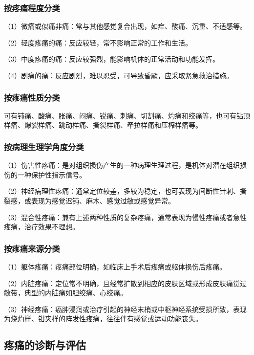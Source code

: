\subsubsection{按疼痛程度分类}

（1）微痛或似痛非痛：常与其他感觉复合出现，如痒、酸痛、沉重、不适感等。

（2）轻度疼痛的痛：反应较轻，常不影响正常的工作和生活。

（3）中度疼痛的痛：反应较强烈，能影响机体的正常活动和功能发挥。

（4）剧痛的痛：反应剧烈，难以忍受，可导致昏厥，应采取紧急救治措施。

\subsubsection{按疼痛性质分类}

可有钝痛、酸痛、胀痛、闷痛、锐痛、刺痛、切割痛、灼痛和绞痛等，也可有钻顶样痛、爆裂样痛、跳动样痛、撕裂样痛、牵拉样痛和压榨样痛等。

\subsubsection{按病理生理学角度分类}

（1）伤害性疼痛：是对组织损伤产生的一种病理生理过程，是机体对潜在组织损伤的一种保护性指示信号。

（2）神经病理性疼痛：通常定位较差，多较为稳定，也可表现为间断性针刺、撕裂感，或表现为感觉迟钝、麻木、感觉过敏或感觉异常。

（3）混合性疼痛：兼有上述两种性质的复杂疼痛，通常表现为慢性疼痛或者急性疼痛，治疗效果不理想。

\subsubsection{按疼痛来源分类}

（1）躯体疼痛：疼痛部位明确，如临床上手术后疼痛或躯体损伤后疼痛。

（2）内脏疼痛：定位常不明确，且经常扩散到相应的皮肤区域或形成皮肤痛觉过敏带，典型的内脏痛如胆绞痛、心绞痛。

（3）神经疼痛：癌肿浸润或治疗引起的神经末梢或中枢神经系统受损所致，表现为烧灼样、钳夹样的阵发性疼痛，往往伴有感觉或运动功能丧失。

\subsection{疼痛的诊断与评估}

